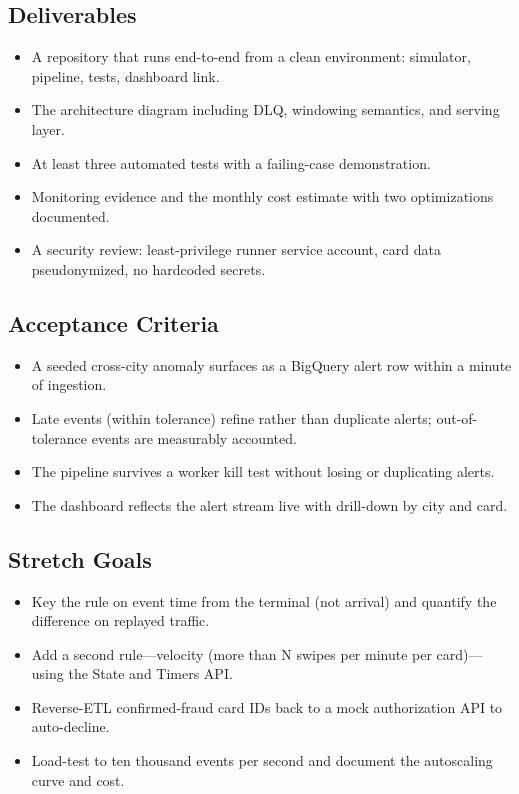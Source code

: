 \subsection*{Deliverables}
\begin{itemize}
    \item A repository that runs end-to-end from a clean environment: simulator, pipeline, tests, dashboard link.
    \item The architecture diagram including DLQ, windowing semantics, and serving layer.
    \item At least three automated tests with a failing-case demonstration.
    \item Monitoring evidence and the monthly cost estimate with two optimizations documented.
    \item A security review: least-privilege runner service account, card data pseudonymized, no hardcoded secrets.
\end{itemize}

\subsection*{Acceptance Criteria}
\begin{itemize}
    \item A seeded cross-city anomaly surfaces as a BigQuery alert row within a minute of ingestion.
    \item Late events (within tolerance) refine rather than duplicate alerts; out-of-tolerance events are measurably accounted.
    \item The pipeline survives a worker kill test without losing or duplicating alerts.
    \item The dashboard reflects the alert stream live with drill-down by city and card.
\end{itemize}

\subsection*{Stretch Goals}
\begin{itemize}
    \item Key the rule on event time from the terminal (not arrival) and quantify the difference on replayed traffic.
    \item Add a second rule---velocity (more than N swipes per minute per card)---using the State and Timers API.
    \item Reverse-ETL confirmed-fraud card IDs back to a mock authorization API to auto-decline.
    \item Load-test to ten thousand events per second and document the autoscaling curve and cost.
\end{itemize}

